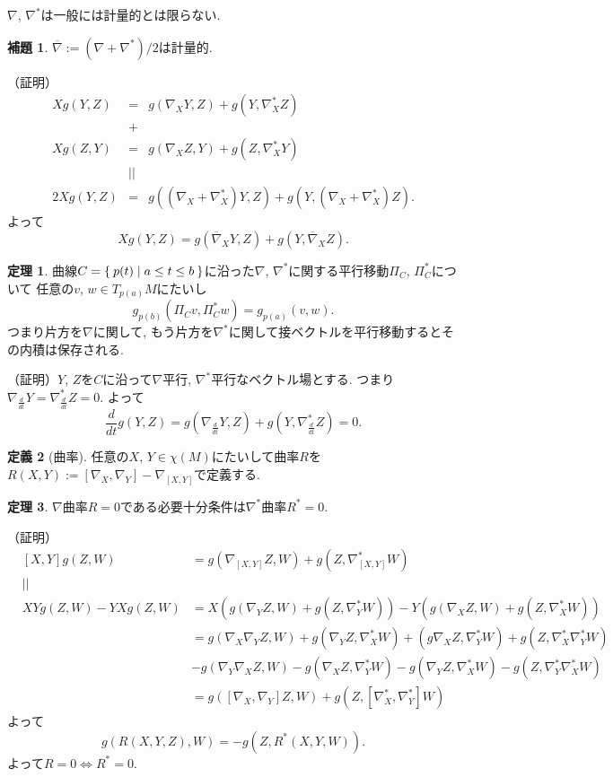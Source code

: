\documentclass{jsarticle}
\newcommand{\con}{\nabla}
\newcommand{\dcon}{\con^{*}}
\newcommand{\mcon}{\overline{\con}}
\theoremstyle{definition}
\newtheorem{theorem}{定理}
\newtheorem{lemma}{補題}
\newtheorem{definition}[theorem]{定義}
\numberwithin{theorem}{section}
\begin{document}
$\con$, $\dcon$は一般には計量的とは限らない.
\begin{lemma}
$\mcon:=(\con+\dcon)/2$は計量的.
\end{lemma}
（証明）
\begin{eqnarray*}
Xg(Y,Z)&=&g(\con_X Y, Z)+g(Y, \dcon_X Z)\\
&+&\\
Xg(Z,Y)&=&g(\con_X Z, Y)+g(Z, \dcon_X Y)\\
&||&\\
2Xg(Y,Z)&=&g((\con_X+\dcon_X)Y,Z)+g(Y,(\con_X+\dcon_X)Z).
\end{eqnarray*}
よって
\[
Xg(Y,Z)=g(\mcon_X Y, Z)+g(Y, \mcon_X Z).
\]
\begin{theorem}
曲線$C=\Set{p(t)|a\leq t \leq b}$に沿った$\con$, $\dcon$に関する平行移動$\Pi_C$, $\Pi^{*}_C$について
任意の$v$, $w \in T_{p(a)}M$にたいし
\[
g_{p(b)}(\Pi_C v, \Pi^{*}_C w)=g_{p(a)}(v,w).
\]
つまり片方を$\con$に関して, もう片方を$\dcon$に関して接ベクトルを平行移動するとその内積は保存される.
\end{theorem}

（証明）$Y$, $Z$を$C$に沿って$\con$平行, $\dcon$平行なベクトル場とする.
つまり$\con_{\frac{d}{dt}}Y=\dcon_{\frac{d}{dt}}Z=0$.
よって
\[
\frac{d}{dt}g(Y,Z)=g(\con_{\frac{d}{dt}}Y,Z)+g(Y,\dcon_{\frac{d}{dt}}Z)=0.
\]
\begin{definition}[曲率]
任意の$X$, $Y \in \chi(M)$にたいして曲率$R$を$R(X,Y):=[\con_X, \con_Y] - \con_{[X,Y]}$で定義する.
\end{definition}

\begin{theorem}
$\con$曲率$R=0$である必要十分条件は$\dcon$曲率$R^{*}=0$.
\end{theorem}

（証明）
\begin{eqnarray*}
& [X,Y]g(Z,W)&=g(\con_{[X,Y]}Z,W)+g(Z,\dcon_{[X,Y]}W)\\
&||&\\
&XYg(Z,W)-YXg(Z,W)&=X(g(\con_Y Z,W)+g(Z,\dcon_Y W))
-Y(g(\con_X Z,W)+g(Z,\dcon_X W))\\
&&= g(\con_X \con_Y Z,W)+g(\con_Y Z,\dcon_X W)
+(g\con_X Z,\dcon_Y W)+g(Z,\dcon_X \dcon_Y W)\\
&&-g(\con_Y \con_X Z,W)-g(\con_X Z,\dcon_Y W)
-g(\con_Y Z,\dcon_X W)-g(Z,\dcon_Y \dcon_X W)\\
&&= g([\con_X,\con_Y]Z,W)+g(Z,[\dcon_X,\dcon_Y]W)
\end{eqnarray*}
よって
\[
g(R(X,Y,Z),W)=-g(Z,R^*(X,Y,W)).
\]
よって$R=0 \iff R^*=0$.
\end{document}
